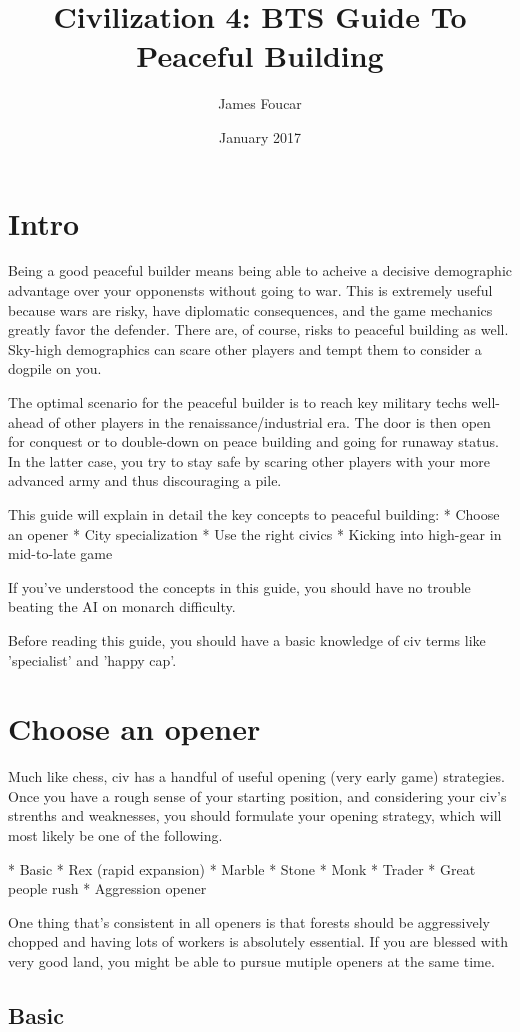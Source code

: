 \documentclass[10pt]{article}
\title{Civilization 4: BTS Guide To Peaceful Building}
\author{James Foucar}
\date{January 2017}
\begin{document}
\section*{Intro}

Being a good peaceful builder means being able to acheive a decisive demographic advantage
over your opponensts without going to war. This is extremely useful because wars are risky, have
diplomatic consequences, and the game mechanics greatly favor the defender. There are, of course,
risks to peaceful building as well. Sky-high demographics can scare other players and tempt them
to consider a dogpile on you.

The optimal scenario for the peaceful builder is to reach key military
techs well-ahead of other players in the renaissance/industrial era. The door is then open for conquest
or to double-down on peace building and going for runaway status. In the latter case, you try to stay
safe by scaring other players with your more advanced army and thus discouraging a pile.

This guide will explain in detail the key concepts to peaceful building:
* Choose an opener
* City specialization
* Use the right civics
* Kicking into high-gear in mid-to-late game

If you've understood the concepts in this guide, you should have no trouble beating the AI
on monarch difficulty.

Before reading this guide, you should have a basic knowledge of civ terms like 'specialist'
and 'happy cap'.

\section*{Choose an opener}

Much like chess, civ has a handful of useful opening (very early game) strategies. Once you
have a rough sense of your starting position, and considering your civ's strenths and weaknesses,
you should formulate your opening strategy, which will most likely be one of the following.

* Basic
* Rex (rapid expansion)
* Marble
* Stone
* Monk
* Trader
* Great people rush
* Aggression opener

One thing that's consistent in all openers is that forests should be aggressively chopped and
having lots of workers is absolutely essential. If you are blessed with very good land, you
might be able to pursue mutiple openers at the same time.

\subsection*{Basic}
\end{document}
